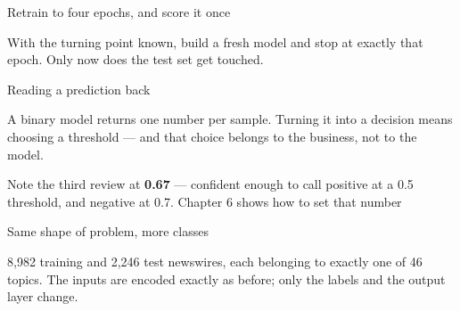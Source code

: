 \documentclass[aspectratio=169,11pt,t]{beamer}
\begin{document}
\begin{frame}[shrink=25]{Retrain to four epochs, and score it once}
{\fontsize{9.4}{12.6}\selectfont\color{fg2}With the turning point known, build a fresh model and stop at exactly that epoch. Only now does the test set get touched.\par}\vskip 4pt
\begin{minipage}[t]{0.494\textwidth}
\end{minipage}%
\hfill
\begin{minipage}[t]{0.494\textwidth}
\end{minipage}%
\end{frame}

\begin{frame}[shrink=25]{Reading a prediction back}
{\fontsize{9.4}{12.6}\selectfont\color{fg2}A binary model returns one number per sample. Turning it into a decision means choosing a threshold --- and that choice belongs to the business, not to the model.\par}\vskip 4pt
\begin{iband}[signal]
Note the third review at \textbf{0.67} --- confident enough to call positive at a 0.5 threshold, and negative at 0.7. Chapter 6 shows how to set that number 
\end{iband}
\end{frame}


\begin{frame}[shrink=25]{Same shape of problem, more classes}
{\fontsize{9.4}{12.6}\selectfont\color{fg2}8,982 training and 2,246 test newswires, each belonging to exactly one of 46 topics. The inputs are encoded exactly as before; only the labels and the output layer change.\par}\vskip 4pt
\end{frame}
\end{document}
